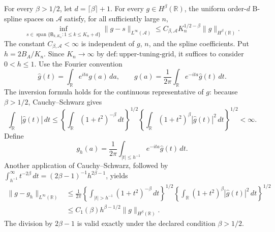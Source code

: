 For every \(\beta>1/2\), let \(d=\lceil\beta\rceil+1\).  For every
\(g\in H^\beta(\mathbb R)\), the uniform order-\(d\) B-spline spaces on
\(\mathcal A\) satisfy, for all sufficiently large \(n\),
\[
 \inf_{s\in\operatorname{span}\{\mathsf B_{k,K_n}:1\le k\le K_n+d\}}
 \|g-s\|_{L^\infty(\mathcal A)}
 \le C_{\beta,\mathcal A}K_n^{1/2-\beta}
       \|g\|_{H^\beta(\mathbb R)}.
\]
The constant \(C_{\beta,\mathcal A}<\infty\) is independent of \(g\),
\(n\), and the spline coefficients.
Put \(h=2B_A/K_n\).  Since \(K_n\to\infty\) by
\(\mathrm{def{:}upper\text{-}tuning\text{-}grid}\), it suffices to consider
\(0<h\le1\).  Use the Fourier convention
\[
 \widehat g(t)=\int_{\mathbb R}e^{ita}g(a)\,da,
 \qquad
 g(a)=\frac1{2\pi}\int_{\mathbb R}e^{-ita}\widehat g(t)\,dt.
\]
The inversion formula holds for the continuous representative of \(g\):
because \(\beta>1/2\), Cauchy--Schwarz gives
\[
 \int_{\mathbb R}|\widehat g(t)|\,dt
 \le
 \left\{\int_{\mathbb R}(1+t^2)^{-\beta}\,dt\right\}^{1/2}
 \left\{\int_{\mathbb R}(1+t^2)^\beta
                    |\widehat g(t)|^2\,dt\right\}^{1/2}<\infty.       \tag{1}
\]
Define
\[
 g_h(a)=\frac1{2\pi}\int_{|t|\le h^{-1}}
          e^{-ita}\widehat g(t)\,dt.
\]
Another application of Cauchy--Schwarz, followed by
\(\int_{h^{-1}}^\infty t^{-2\beta}\,dt
=(2\beta-1)^{-1}h^{2\beta-1}\), yields
\[
 \begin{aligned}
 \|g-g_h\|_{L^\infty(\mathbb R)}
 &\le \frac1{2\pi}
 \left\{\int_{|t|>h^{-1}}(1+t^2)^{-\beta}\,dt\right\}^{1/2}
 \left\{\int_{\mathbb R}(1+t^2)^\beta
                    |\widehat g(t)|^2\,dt\right\}^{1/2}\\
 &\le C_1(\beta)h^{\beta-1/2}\|g\|_{H^\beta(\mathbb R)}.            \tag{2}
 \end{aligned}
\]
The division by \(2\beta-1\) is valid exactly under the declared condition
\(\beta>1/2\).

